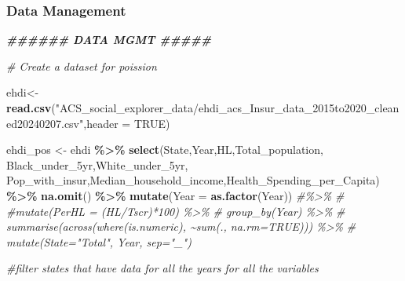 \documentclass[
]{article}
\newenvironment{Shaded}{\begin{snugshade}}{\end{snugshade}}
\newcommand{\AttributeTok}[1]{\textcolor[rgb]{0.13,0.29,0.53}{#1}}
\newcommand{\CommentTok}[1]{\textcolor[rgb]{0.56,0.35,0.01}{\textit{#1}}}
\newcommand{\ConstantTok}[1]{\textcolor[rgb]{0.56,0.35,0.01}{#1}}
\newcommand{\DocumentationTok}[1]{\textcolor[rgb]{0.56,0.35,0.01}{\textbf{\textit{#1}}}}
\newcommand{\FunctionTok}[1]{\textcolor[rgb]{0.13,0.29,0.53}{\textbf{#1}}}
\newcommand{\NormalTok}[1]{#1}
\newcommand{\OtherTok}[1]{\textcolor[rgb]{0.56,0.35,0.01}{#1}}
\newcommand{\SpecialCharTok}[1]{\textcolor[rgb]{0.81,0.36,0.00}{\textbf{#1}}}
\newcommand{\StringTok}[1]{\textcolor[rgb]{0.31,0.60,0.02}{#1}}
\begin{document}
\hypertarget{data-management}{%
\subsubsection{Data Management}\label{data-management}}

\begin{Shaded}
\begin{Highlighting}[]
\DocumentationTok{\#\#\#\#\#\# DATA MGMT \#\#\#\#\#}

\CommentTok{\# Create a dataset for poission}

\NormalTok{ehdi}\OtherTok{\textless{}{-}} \FunctionTok{read.csv}\NormalTok{(}\StringTok{"ACS\_social\_explorer\_data/ehdi\_acs\_Insur\_data\_2015to2020\_cleaned20240207.csv"}\NormalTok{,}\AttributeTok{header =} \ConstantTok{TRUE}\NormalTok{)}

\NormalTok{ehdi\_pos }\OtherTok{\textless{}{-}}\NormalTok{ ehdi }\SpecialCharTok{\%\textgreater{}\%} 
  \FunctionTok{select}\NormalTok{(}\StringTok{\textasciigrave{}}\AttributeTok{State}\StringTok{\textasciigrave{}}\NormalTok{,}\StringTok{\textasciigrave{}}\AttributeTok{Year}\StringTok{\textasciigrave{}}\NormalTok{,}\StringTok{\textasciigrave{}}\AttributeTok{HL}\StringTok{\textasciigrave{}}\NormalTok{,}\StringTok{\textasciigrave{}}\AttributeTok{Total\_population}\StringTok{\textasciigrave{}}\NormalTok{, }\StringTok{\textasciigrave{}}\AttributeTok{Black\_under\_5yr}\StringTok{\textasciigrave{}}\NormalTok{,}\StringTok{\textasciigrave{}}\AttributeTok{White\_under\_5yr}\StringTok{\textasciigrave{}}\NormalTok{, }\StringTok{\textasciigrave{}}\AttributeTok{Pop\_with\_insur}\StringTok{\textasciigrave{}}\NormalTok{,}\StringTok{\textasciigrave{}}\AttributeTok{Median\_household\_income}\StringTok{\textasciigrave{}}\NormalTok{,}\StringTok{\textasciigrave{}}\AttributeTok{Health\_Spending\_per\_Capita}\StringTok{\textasciigrave{}}\NormalTok{) }\SpecialCharTok{\%\textgreater{}\%} 
  \FunctionTok{na.omit}\NormalTok{() }\SpecialCharTok{\%\textgreater{}\%}
 \FunctionTok{mutate}\NormalTok{(}\AttributeTok{Year =} \FunctionTok{as.factor}\NormalTok{(Year)) }\CommentTok{\#\%\textgreater{}\% }
  \CommentTok{\# \#mutate(PerHL = (HL/Tscr)*100) \%\textgreater{}\% }
  \CommentTok{\# group\_by(Year) \%\textgreater{}\%}
  \CommentTok{\#             summarise(across(where(is.numeric), \textasciitilde{}sum(., na.rm=TRUE))) \%\textgreater{}\%}
  \CommentTok{\#             mutate(State="Total", Year, sep="\_")}


\CommentTok{\#filter states that have data for all the years for all the variables}



\end{Highlighting}
\end{Shaded}
\end{document}
